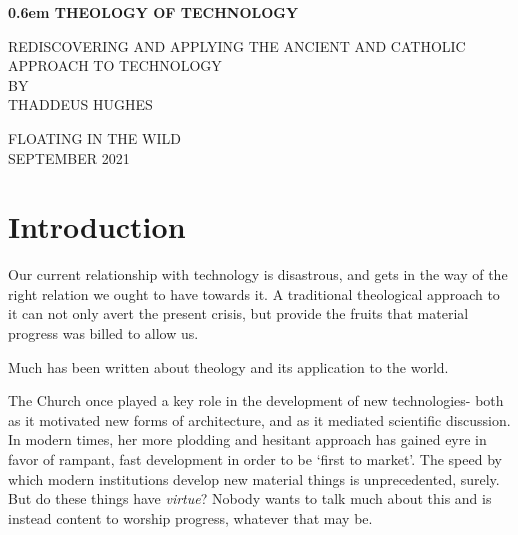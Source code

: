 \documentclass[letterpaper]{article}
\begin{document}
\clearpage
\newcommand\nbvspace[1][3]{\vspace*{\stretch{#1}}}
\newcommand\nbstretchyspace{\spaceskip0.5em plus 0.25em minus 0.25em}
\newcommand{\nbtitlestretch}{\spaceskip0.6em}
\pagestyle{plain}
\begin{center}
  \bfseries
  \nbvspace[1]
  \Huge
  {\nbtitlestretch\huge
    THEOLOGY OF TECHNOLOGY}

  \nbvspace[1]
  \normalsize
  REDISCOVERING AND APPLYING THE ANCIENT AND CATHOLIC APPROACH TO TECHNOLOGY\\

  \nbvspace[1]
  \small BY\\
  \Large THADDEUS HUGHES\\

  \nbvspace[2]

  \nbvspace[3]
  \normalsize

  \large
  FLOATING IN THE WILD \\
  \small SEPTEMBER 2021 \\
\end{center}

\raggedbottom
\tableofcontents

\newpage


\section{Introduction}

Our current relationship with technology is disastrous, and gets in the way of the right relation we ought to have towards it. A traditional theological approach to it can not only avert the present crisis, but provide the fruits that material progress was billed to allow us.


Much has been written about theology and its application to the world. 

The Church once played a key role in the development of new technologies- both as it motivated new forms of architecture, and as it mediated scientific discussion. In modern times, her more plodding and hesitant approach has gained eyre in favor of rampant, fast development in order to be `first to market'. The speed by which modern institutions develop new material things is unprecedented, surely. But do these things have \textit{virtue}? Nobody wants to talk much about this and is instead content to worship progress, whatever that may be.
\end{document}
